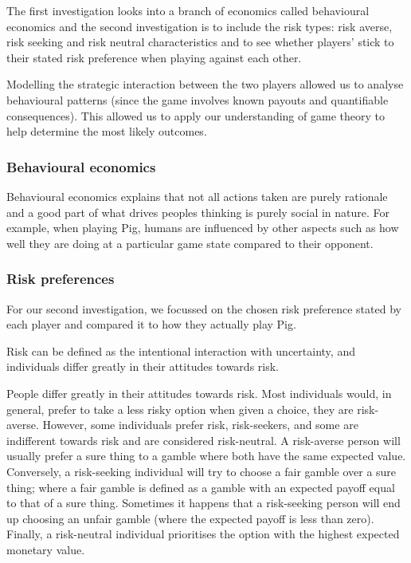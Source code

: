 \documentclass[a4paper,titlepage]{article}
\begin{document}
The first investigation looks into a branch of economics called behavioural economics and the second investigation is to include the risk types: risk averse, risk seeking and risk neutral characteristics and to see whether players' stick to their stated risk preference when playing against each other.

Modelling the strategic interaction between the two players allowed us to analyse behavioural patterns (since the game involves known payouts and quantifiable consequences). This allowed us to apply our understanding of game theory to help determine the most likely outcomes.

\subsubsection{Behavioural economics}
Behavioural economics explains that not all actions taken are purely rationale and a good part of what drives peoples thinking is purely social in nature. For example, when playing Pig, humans are influenced by other aspects such as how well they are doing at a particular game state compared to their opponent.

\subsubsection{Risk preferences}
For our second investigation, we focussed on the chosen risk preference stated by each player and compared it to how they actually play Pig.

Risk can be defined as the intentional interaction with uncertainty, and individuals differ greatly in their attitudes towards risk.\cite{what_is_risk_2017}

People differ greatly in their attitudes towards risk. Most individuals would, in general, prefer to take a less risky option when given a choice, they are risk-averse. However, some individuals prefer risk, risk-seekers, and some are indifferent towards risk and are considered risk-neutral. A risk-averse person will usually prefer a sure thing to a gamble where both have the same expected value. Conversely, a risk-seeking individual will try to choose a fair gamble over a sure thing; where a fair gamble is defined as a gamble with an expected payoff equal to that of a sure thing. Sometimes it happens that a risk-seeking person will end up choosing an unfair gamble (where the expected payoff is less than zero). Finally, a risk-neutral individual prioritises the option with the highest expected monetary value.
\end{document}
